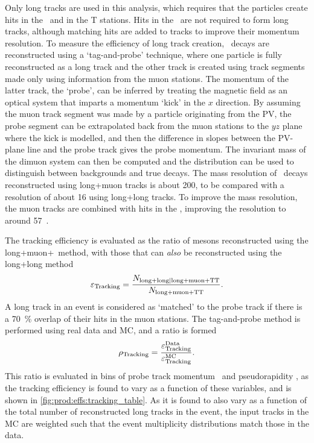 Only long tracks are used in this analysis, which requires that the particles
create hits in the \velo\ and in the T stations.
Hits in the \ttracker\ are not required to form long tracks, although matching
hits are added to tracks to improve their momentum resolution.
To measure the efficiency of long track creation, \JpsiTomumu\ decays are
reconstructed using a `tag-and-probe' technique, where one particle is fully
reconstructed as a long track and the other track is created using track
segments made only using information from the muon stations.
The momentum of the latter track, the `probe', can be inferred by treating the
magnetic field as an optical system that imparts a momentum `kick' in the $x$
direction.
By assuming the muon track segment was made by a particle originating from the
\ac{PV}, the probe segment can be extrapolated back from the muon stations to
the $yz$ plane where the kick is modelled, and then the difference in slopes
between the \ac{PV}-plane line and the probe track gives the probe momentum.
The invariant mass of the dimuon system can then be computed and the
distribution can be used to distinguish between backgrounds and true \PJpsi
decays.
The mass resolution of \JpsiTomumu\ decays reconstructed using long+muon tracks
is about \SI{200}{\MeVcc}, to be compared with a resolution of about
\SI{16}{\MeVcc} using long+long tracks.
To improve the mass resolution, the muon tracks are combined with hits in the
\ttracker, improving the resolution to around
\SI{57}{\MeVcc}~\cite{Aaij:2014pwa,DeCian:2013zua}.

The tracking efficiency is evaluated as the ratio of \PJpsi mesons
reconstructed using the long+muon+\ttracker\ method, with those that can
\emph{also} be reconstructed using the long+long method
\begin{equation}
  \eff_{\text{Tracking}} =
  \frac{%
    N_{\text{long+long}|\text{long+muon+TT}}
  }{%
    N_{\text{long+muon+TT}}
  }.
  \label{eqn:prod:effs:tracking_eff}
\end{equation}
A long track in an event is considered as `matched' to the probe track if there
is a \SI{70}{\percent} overlap of their hits in the muon stations.
The tag-and-probe method is performed using real data and \ac{MC}, and a ratio
is formed
\begin{equation}
  \efftracking = \frac{%
    \eff_{\text{Tracking}}^{\text{Data}}
  }{%
    \eff_{\text{Tracking}}^{\text{MC}}
  }.
  \label{eqn:prod:effs:tracking_ratio}
\end{equation}
This ratio is evaluated in bins of probe track momentum \ptot\ and
pseudorapidity \Eta, as the tracking efficiency is found to vary as a function
of these variables, and is shown in \cref{fig:prod:effs:tracking_table}.
As it is found to also vary as a function of the total number of reconstructed
long tracks in the event, the input tracks in the \ac{MC} are weighted such
that the event multiplicity distributions match those in the data.

